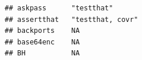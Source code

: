 \documentclass[]{article}
\begin{document}
\begin{verbatim}
## askpass      "testthat"                                                                                                                                                                                                                                                                                                                                                                                                                                                                                                                                                                                
## assertthat   "testthat, covr"                                                                                                                                                                                                                                                                                                                                                                                                                                                                                                                                                                          
## backports    NA                                                                                                                                                                                                                                                                                                                                                                                                                                                                                                                                                                                        
## base64enc    NA                                                                                                                                                                                                                                                                                                                                                                                                                                                                                                                                                                                        
## BH           NA                                                                                                                                                                                                                                                                                                                                                                                                                                                                                                                                                                                        

\end{verbatim}
\end{document}
